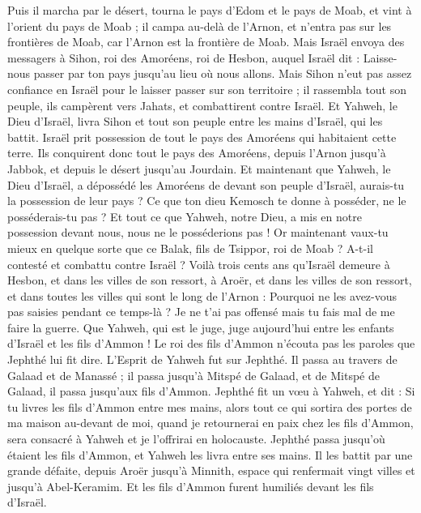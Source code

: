 \begin{multicols}{2}
Puis il marcha par le désert, tourna le pays d'Edom et le pays de Moab, et vint à l'orient du pays de Moab ; il campa au-delà de l'Arnon, et n'entra pas sur les frontières de Moab, car l'Arnon est la frontière de Moab.
Mais Israël envoya des messagers à Sihon, roi des Amoréens, roi de Hesbon, auquel Israël dit : Laisse-nous passer par ton pays jusqu'au lieu où nous allons.
Mais Sihon n'eut pas assez confiance en Israël pour le laisser passer sur son territoire ; il rassembla tout son peuple, ils campèrent vers Jahats, et combattirent contre Israël.
Et Yahweh, le Dieu d'Israël, livra Sihon et tout son peuple entre les mains d'Israël, qui les battit. Israël prit possession de tout le pays des Amoréens qui habitaient cette terre.
Ils conquirent donc tout le pays des Amoréens, depuis l'Arnon jusqu'à Jabbok, et depuis le désert jusqu'au Jourdain.
Et maintenant que Yahweh, le Dieu d'Israël, a dépossédé les Amoréens de devant son peuple d'Israël, aurais-tu la possession de leur pays ?
Ce que ton dieu Kemosch te donne à posséder, ne le posséderais-tu pas ? Et tout ce que Yahweh, notre Dieu, a mis en notre possession devant nous, nous ne le posséderions pas !
Or maintenant vaux-tu mieux en quelque sorte que ce Balak, fils de Tsippor, roi de Moab ? A-t-il contesté et combattu contre Israël ?
Voilà trois cents ans qu'Israël demeure à Hesbon, et dans les villes de son ressort, à Aroër, et dans les villes de son ressort, et dans toutes les villes qui sont le long de l'Arnon : Pourquoi ne les avez-vous pas saisies pendant ce temps-là ?
Je ne t'ai pas offensé mais tu fais mal de me faire la guerre. Que Yahweh, qui est le juge, juge aujourd'hui entre les enfants d'Israël et les fils d'Ammon !
Le roi des fils d'Ammon n'écouta pas les paroles que Jephthé lui fit dire.
L'Esprit de Yahweh fut sur Jephthé. Il passa au travers de Galaad et de Manassé ; il passa jusqu'à Mitspé de Galaad, et de Mitspé de Galaad, il passa jusqu'aux fils d'Ammon.
Jephthé fit un vœu à Yahweh, et dit : Si tu livres les fils d'Ammon entre mes mains,
alors tout ce qui sortira des portes de ma maison au-devant de moi, quand je retournerai en paix chez les fils d'Ammon, sera consacré à Yahweh et je l'offrirai en holocauste.
Jephthé passa jusqu'où étaient les fils d'Ammon, et Yahweh les livra entre ses mains.
Il les battit par une grande défaite, depuis Aroër jusqu'à Minnith, espace qui renfermait vingt villes et jusqu'à Abel-Keramim. Et les fils d'Ammon furent humiliés devant les fils d'Israël.

\end{multicols}

